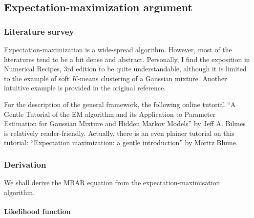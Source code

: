 \documentclass[aip,jcp,preprint,notitlepage, superscriptaddress]{revtex4-1}
\begin{document}
\subsection{Expectation-maximization argument}



\subsubsection{Literature survey}



Expectation-maximization\cite{
dempster1977, duda, press3rd}
is a wide-spread algorithm.
%
However, most of the literatures
tend to be a bit dense and abstract.
%
Personally,
I find the exposition in Numerical Recipes,
3rd edition\cite{press3rd}
to be quite understandable,
although it is limited to
the example of soft $K$-means clustering
of a Gaussian mixture.
%
Another intuitive example
is provided in the original reference\cite{
dempster1977}.

For the description of the general framework,
the following online tutorial
``A Gentle Tutorial of the EM algorithm
and its Application to Parameter Estimation
for Gaussian Mixture and Hidden Markov Models''
by Jeff A. Bilmes is relatively reader-friendly.
%
Actually, there is an even plainer tutorial on this tutorial:
``Expectation maximization: a gentle introduction''
by Moritz Blume.




\subsubsection{Derivation}


We shall derive the MBAR equation from
the expectation-maximisation algorithm\cite{dempster1977,
duda, press3rd, habeck2012}.
%

\paragraph{Likelihood function}
\end{document}
